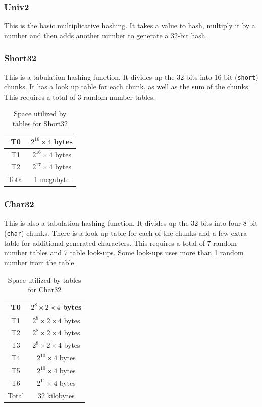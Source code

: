 \documentclass[11pt]{article}
\begin{document}
\subsubsection{Univ2}
This is the basic multiplicative hashing. It takes a value to hash, multiply it by a number
and then adds another number to generate a 32-bit hash. 

\subsubsection{Short32}
This is a tabulation hashing function. It divides up the 32-bits into 16-bit (\texttt{short}) chunks. 
It has a look up table for each chunk, as well as the sum of the chunks.  
This requires a total of 3 random number tables. 

\begin{table}
\centering 
\begin{tabular}{|c|c|}
  \hline
T0 & $2^{16}\times4$ bytes\\  \hline
T1 & $2^{16}\times4$ bytes\\ \hline
T2 & $2^{17}\times4$ bytes\\
  \hline \hline
  Total & 1 megabyte \\
  \hline
\end{tabular}
\caption{Space utilized by tables for Short32}
\label{tab:short32mem}
\end{table}

\subsubsection{Char32}
This is also a tabulation hashing function. It divides up the 32-bits into 
four 8-bit (\texttt{char}) chunks. There is a look up table for each of the
chunks and a few extra table for additional generated characters. 
This requires a total of 7 random number tables and 7 table look-ups. 
Some look-ups uses more than 1 random number from the table.

\begin{table}
\centering 
\begin{tabular}{|c|c|}
  \hline
T0 & $2^{8}\times 2 \times4$ bytes\\  \hline
T1 & $2^{8}\times 2 \times4$ bytes\\ \hline
T2 & $2^{8}\times 2 \times4$ bytes\\  \hline
T3 & $2^{8}\times 2 \times4$ bytes\\ \hline
T4 & $2^{10}\times4$ bytes\\  \hline
T5 & $2^{10}\times4$ bytes\\ \hline
T6 & $2^{11}\times4$ bytes\\
  \hline \hline
  Total & 32 kilobytes \\
  \hline
\end{tabular}
\caption{Space utilized by tables for Char32}
\label{tab:char32mem}
\end{table}
\end{document}
